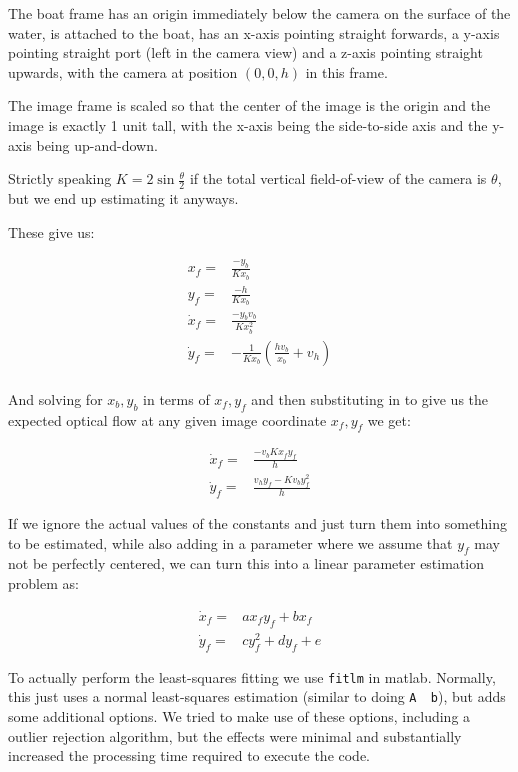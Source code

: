 \documentclass{article}
\begin{document}
The boat frame has an origin immediately below the camera on the surface of
the water, is attached to the boat, has an x-axis pointing straight forwards,
a y-axis pointing straight port (left in the camera view) and a z-axis pointing
straight upwards, with the camera at position $(0, 0, h)$ in this frame.

The image frame is scaled so that the center of the image is the origin and
the image is exactly 1 unit tall, with the x-axis being the side-to-side axis
and the y-axis being up-and-down.

Strictly speaking $K = 2\sin\frac\theta2$ if the total vertical field-of-view
of the camera is $\theta$, but we end up estimating it anyways.

These give us:

\begin{align*}
x_f =& \frac{-y_b}{Kx_b} \\
y_f =& \frac{-h}{Kx_b} \\
\dot{x}_f =& \frac{-y_bv_b}{Kx^2_b} \\
\dot{y}_f =& -\frac{1}{Kx_b}(\frac{hv_b}{x_b} + v_h) \\
\end{align*}

And solving for $x_b, y_b$ in terms of $x_f, y_f$ and then substituting in to
give us the expected optical flow at any given image coordinate $x_f, y_f$ we
get:

\begin{align}
\dot{x}_f =& \frac{-v_bKx_fy_f}{h} \\
\dot{y}_f =& \frac{v_hy_f - Kv_by_f^2}{h}
\end{align}

If we ignore the actual values of the constants and just turn them into
something to be estimated, while also adding in a parameter where we
assume that $y_f$ may not be perfectly centered, we can turn this into a
linear parameter estimation problem as:

\begin{align}
\dot{x}_f =& ax_fy_f + bx_f \\
\dot{y}_f =& cy_f^2 + dy_f + e
\end{align}

To actually perform the least-squares fitting we use \texttt{fitlm} in
matlab. Normally, this just uses a normal least-squares estimation
(similar to doing \texttt{A \ b}), but adds some additional
options. We tried to make use of these options, including a outlier
rejection algorithm, but the effects were minimal and substantially
increased the processing time required to execute the code.
\end{document}
